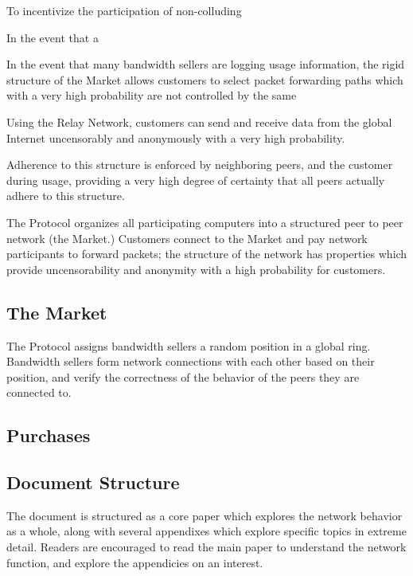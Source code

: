 To incentivize the participation of non-colluding

In the event that a

In the event that many bandwidth sellers are logging usage
information, the rigid structure of the \Ordhic{} Market allows
customers to select packet forwarding paths which with a very high
probability are not controlled by the same

Using the Relay
Network, customers can send and receive data from the global Internet
uncensorably and anonymously with a very high probability.

Adherence to this structure is enforced by
neighboring peers, and the customer during usage, providing a very
high degree of certainty that all peers actually adhere to this
structure.

The \Orchid{} Protocol organizes all participating computers into a
structured peer to peer network (the \Orchid{} Market.) Customers
connect to the \Orchid{} Market and pay network participants to
forward packets; the structure of the network has properties which
provide uncensorability and anonymity with a high probability for
customers.



\subsection{The \Orchid{} Market}

The \Orchid{} Protocol assigns bandwidth sellers a random position in
a global ring. Bandwidth sellers form network connections with each
other based on their position, and verify the correctness of the
behavior of the peers they are connected to.

\subsection{Purchases}



\subsection{Document Structure}

The document is structured as a core paper which explores the network
behavior as a whole, along with several appendixes which explore
specific topics in extreme detail. Readers are encouraged to read the
main paper to understand the network function, and explore the
appendicies on an interest.

